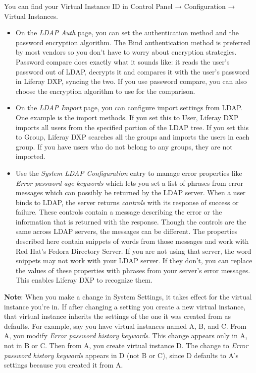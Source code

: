 You can find your Virtual Instance ID in Control Panel → Configuration →
Virtual Instances.

\begin{itemize}
\item
  On the \emph{LDAP Auth} page, you can set the authentication method
  and the password encryption algorithm. The Bind authentication method
  is preferred by most vendors so you don't have to worry about
  encryption strategies. Password compare does exactly what it sounds
  like: it reads the user's password out of LDAP, decrypts it and
  compares it with the user's password in Liferay DXP, syncing the two.
  If you use password compare, you can also choose the encryption
  algorithm to use for the comparison.
\item
  On the \emph{LDAP Import} page, you can configure import settings from
  LDAP. One example is the import methods. If you set this to User,
  Liferay DXP imports all users from the specified portion of the LDAP
  tree. If you set this to Group, Liferay DXP searches all the groups
  and imports the users in each group. If you have users who do not
  belong to any groups, they are not imported.
\item
  Use the \emph{System LDAP Configuration} entry to manage error
  properties like \emph{Error password age keywords} which lets you set
  a list of phrases from error messages which can possibly be returned
  by the LDAP server. When a user binds to LDAP, the server returns
  \emph{controls} with its response of success or failure. These
  controls contain a message describing the error or the information
  that is returned with the response. Though the controls are the same
  across LDAP servers, the messages can be different. The properties
  described here contain snippets of words from those messages and work
  with Red Hat's Fedora Directory Server. If you are not using that
  server, the word snippets may not work with your LDAP server. If they
  don't, you can replace the values of these properties with phrases
  from your server's error messages. This enables Liferay DXP to
  recognize them.
\end{itemize}

\noindent\hrulefill

\textbf{Note}: When you make a change in System Settings, it takes
effect for the virtual instance you're in. If after changing a setting
you create a new virtual instance, that virtual instance inherits the
settings of the one it was created from as defaults. For example, say
you have virtual instances named A, B, and C. From A, you modify
\emph{Error password history keywords}. This change appears only in A,
not in B or C. Then from A, you create virtual instance D. The change to
\emph{Error password history keywords} appears in D (not B or C), since
D defaults to A's settings because you created it from A.

